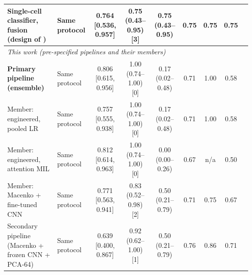 \begin{table}[!t]
\begin{tabular}{p{4.6cm}p{3.6cm}ccccccc}
Single-cell classifier, fusion (design of \cite{sidhom2021apl}) & Same protocol & 0.764 [0.536, 0.957] & 0.75 (0.43--0.95) [3] & 0.75 (0.43--0.95) & 0.75 & 0.75 & 0.75 \\
\midrule
\multicolumn{8}{l}{\emph{This work (pre-specified pipelines and their members)}} \\
\textbf{Primary pipeline (ensemble)} & Same protocol & 0.806 [0.615, 0.956] & 1.00 (0.74--1.00) [0] & 0.17 (0.02--0.48) & 0.71 & 1.00 & 0.58 \\
Member: engineered, pooled LR & Same protocol & 0.757 [0.555, 0.938] & 1.00 (0.74--1.00) [0] & 0.17 (0.02--0.48) & 0.71 & 1.00 & 0.58 \\
Member: engineered, attention MIL & Same protocol & 0.812 [0.614, 0.963] & 1.00 (0.74--1.00) [0] & 0.00 (0.00--0.26) & 0.67 & n/a & 0.50 \\
Member: Macenko + fine-tuned CNN & Same protocol & 0.771 [0.563, 0.941] & 0.83 (0.52--0.98) [2] & 0.50 (0.21--0.79) & 0.71 & 0.75 & 0.67 \\
Secondary pipeline (Macenko + frozen CNN + PCA-64) & Same protocol & 0.639 [0.400, 0.867] & 0.92 (0.62--1.00) [1] & 0.50 (0.21--0.79) & 0.76 & 0.86 & 0.71 \\
\bottomrule
\end{tabular}
\end{table}